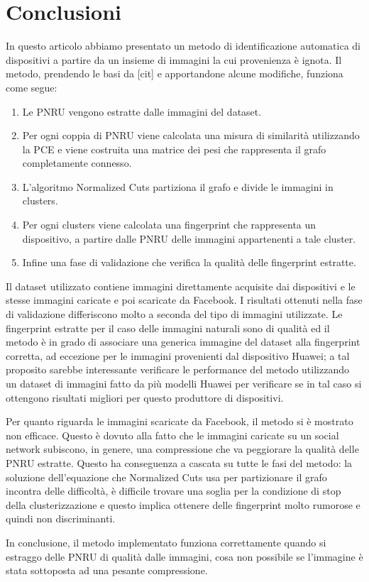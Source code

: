 \section{Conclusioni}

In questo articolo abbiamo presentato un metodo di identificazione automatica di dispositivi a partire da un insieme di immagini la cui provenienza è ignota. Il metodo, prendendo le basi da [cit] e apportandone alcune modifiche, funziona come segue:
\begin{enumerate}
\item Le PNRU vengono estratte dalle immagini del dataset. 
\item Per ogni coppia di PNRU viene calcolata una misura di similarità utilizzando la PCE e viene costruita una matrice dei pesi che rappresenta il grafo completamente connesso.
\item L'algoritmo Normalized Cuts partiziona il grafo e divide le immagini in clusters.
\item Per ogni clusters viene calcolata una fingerprint che rappresenta un dispositivo, a partire dalle PNRU delle immagini appartenenti a tale cluster.
\item Infine una fase di validazione che verifica la qualità delle fingerprint estratte.
\end{enumerate}

Il dataset utilizzato contiene immagini direttamente acquisite dai dispositivi e le stesse immagini caricate e poi scaricate da Facebook. I risultati ottenuti nella fase di validazione differiscono molto a seconda del tipo di immagini utilizzate. Le fingerprint estratte per il caso delle immagini naturali sono di qualità ed il metodo è in grado di associare una generica immagine del dataset alla fingerprint corretta, ad eccezione per le immagini provenienti dal dispositivo Huawei; a tal proposito sarebbe interessante verificare le performance del metodo utilizzando un dataset di immagini fatto da più modelli Huawei per verificare se in tal caso si ottengono risultati migliori per questo produttore di dispositivi. 

Per quanto riguarda le immagini scaricate da Facebook, il metodo si è mostrato non efficace. Questo è dovuto alla fatto che le immagini caricate su un social network subiscono, in genere, una compressione che va peggiorare la qualità delle PNRU estratte. Questo ha conseguenza a cascata su tutte le fasi del metodo: la soluzione dell'equazione che Normalized Cuts usa per partizionare il grafo incontra delle difficoltà, è difficile trovare una soglia per la condizione di stop della clusterizzazione e questo implica ottenere delle fingerprint molto rumorose e quindi non discriminanti.

In conclusione, il metodo implementato funziona correttamente quando si estraggo delle PNRU di qualità dalle immagini, cosa non possibile se l'immagine è stata sottoposta ad una pesante compressione.